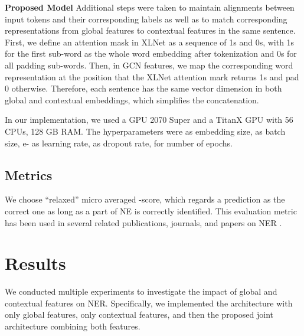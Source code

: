 \documentclass[runningheads]{llncs}
\begin{document}
\noindent\textbf{Proposed Model}
Additional steps were taken to maintain alignments between input tokens and their corresponding labels as well as to match corresponding representations from global features to contextual features in the same sentence. First, we define an attention mask in XLNet as a sequence of 1s and 0s, with 1s for the first sub-word as the whole word embedding after tokenization and 0s for all padding sub-words. Then, in GCN features, we map the corresponding word representation at the position that the XLNet attention mark returns 1s and pad 0 otherwise. Therefore, each sentence has the same vector dimension in both global and contextual embeddings, which simplifies the concatenation. 

In our implementation, we used a GPU 2070 Super and a TitanX GPU with 56 CPUs, 128 GB RAM. The hyperparameters were  as embedding size,  as batch size,  e- as learning rate,  as dropout rate,  for number of epochs.

\subsection{Metrics}








We choose ``relaxed'' micro averaged -score, which regards a prediction as the correct one as long as a part of NE is correctly identified. This evaluation metric has been used in several related publications, journals, and papers on NER \cite{takeuchi2002use} \cite{huang2015bidirectional} \cite{lample2016neural} \cite{ma2016end}.
\vspace{-0.2cm}
\section{Results}
\label{sec:results}
We conducted multiple experiments to investigate the impact of global and contextual features on NER.  Specifically, we implemented the architecture with only global features, only contextual features, and then the proposed joint architecture combining both features. 
\end{document}
